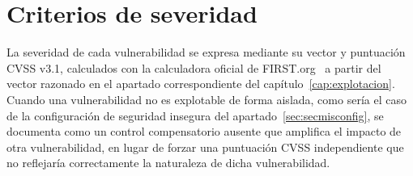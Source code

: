 \section{Criterios de severidad}

La severidad de cada vulnerabilidad se expresa mediante su vector y
puntuación CVSS v3.1, calculados con la calculadora oficial de
FIRST.org~ a
partir del vector razonado en el apartado correspondiente del
capítulo~\ref{cap:explotacion}.
Cuando una vulnerabilidad no es explotable de forma aislada, como sería el caso de la
configuración de seguridad insegura del apartado~\ref{sec:secmisconfig}, se documenta como un
control compensatorio ausente que amplifica el impacto de otra
vulnerabilidad, en lugar de forzar una puntuación CVSS independiente que no
reflejaría correctamente la naturaleza de dicha vulnerabilidad.
